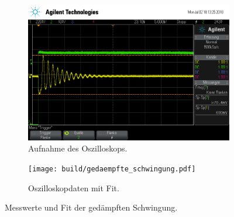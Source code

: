 \begin{figure}[ht]
  \centering
  \begin{subfigure}{\textwidth}
    \centering
    \includegraphics[height=0.3\textheight]{data/scope_275.png}
    \caption{Aufnahme des Oszilloskops.}%
    \label{fig:gedaempft_oszilloskop}
  \end{subfigure}
  \begin{subfigure}{\textwidth}
    \centering
    \texttt{[image: build/gedaempfte\_schwingung.pdf]}
    \caption{Oszilloskopdaten mit Fit.}%
    \label{fig:gedaempft_fit}
  \end{subfigure}
  \caption{Messwerte und Fit der gedämpften Schwingung.}%
  \label{fig:gedaempft}
\end{figure}


